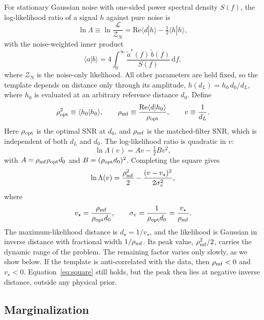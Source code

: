 \documentclass[prd,twocolumn,nofootinbib,superscriptaddress,amsmath,amssymb]{revtex4-2}
\newcommand{\dd}{\mathrm{d}}
\newcommand{\rhomf}{\rho_{\rm mf}}
\newcommand{\rhoopt}{\rho_{\rm opt}}
\newcommand{\dref}{d_0}
\newcommand{\vs}{v_\star}
\newcommand{\ds}{d_\star}
\newcommand{\Lam}{\Lambda}
\begin{document}
For stationary Gaussian noise with one-sided power spectral density $S(f)$,
the log-likelihood ratio of a signal $h$ against pure noise is~\cite{CutlerFlanagan1994,Thrane2019}
\begin{equation}
\ln\Lam \equiv \ln\frac{\mathcal{L}}{\mathcal{Z}_N} = \mathrm{Re}\langle d|h\rangle - \tfrac12\langle h|h\rangle,
\end{equation}
with the noise-weighted inner product
\begin{equation}
\langle a|b\rangle = 4\int_0^\infty \frac{\tilde a^*(f)\,\tilde b(f)}{S(f)}\,\dd f,
\end{equation}
where $\mathcal{Z}_N$ is the noise-only likelihood.
All other parameters are held fixed,
so the template depends on distance only through its amplitude,
$h(d_L) = h_0\,\dref/d_L$,
where $h_0$ is evaluated at an arbitrary reference distance $\dref$.
Define
\begin{equation}
\rhoopt^2 \equiv \langle h_0|h_0\rangle,\qquad
\rhomf \equiv \frac{\mathrm{Re}\langle d|h_0\rangle}{\rhoopt},\qquad
v \equiv \frac{1}{d_L}.
\end{equation}
Here $\rhoopt$ is the optimal SNR at $\dref$,
and $\rhomf$ is the matched-filter SNR,
which is independent of both $d_L$ and $\dref$.
The log-likelihood ratio is quadratic in $v$:
\begin{equation}
\ln\Lam(v) = A v - \tfrac12 B v^2,
\label{eq:lnlambda}
\end{equation}
with $A = \rhomf\rhoopt\dref$ and $B = (\rhoopt\dref)^2$.
Completing the square gives
\begin{equation}
\ln\Lam(v) = \frac{\rhomf^2}{2} - \frac{(v-\vs)^2}{2\sigma_v^2},
\label{eq:square}
\end{equation}
where
\begin{equation}
\vs = \frac{\rhomf}{\rhoopt\dref},\qquad \sigma_v = \frac{1}{\rhoopt\dref} = \frac{\vs}{\rhomf}.
\end{equation}
The maximum-likelihood distance is $\ds = 1/\vs$,
and the likelihood is Gaussian in inverse distance with fractional width $1/\rhomf$.
Its peak value,
$\rhomf^2/2$,
carries the dynamic range of the problem.
The remaining factor varies only slowly,
as we show below.
If the template is anti-correlated with the data,
then $\rhomf<0$ and $\vs<0$.
Equation~\eqref{eq:square} still holds,
but the peak then lies at negative inverse distance,
outside any physical prior.

\subsection{Marginalization}
\end{document}

